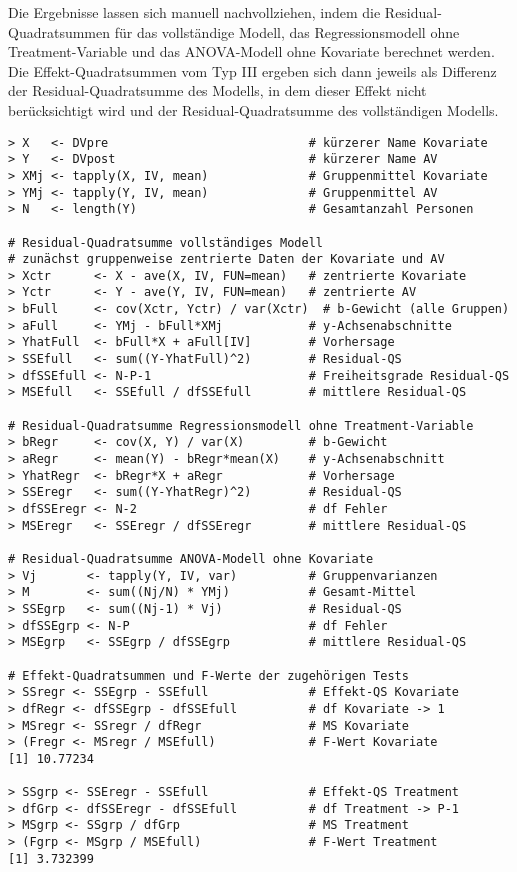 Die Ergebnisse lassen sich manuell nachvollziehen, indem die Residual-Quadratsummen für das vollständige Modell, das Regressionsmodell ohne Treatment-Variable und das ANOVA-Modell ohne Kovariate berechnet werden. Die Effekt-Quadratsummen vom Typ III ergeben sich dann jeweils als Differenz der Residual-Quadratsumme des Modells, in dem dieser Effekt nicht berücksichtigt wird und der Residual-Quadratsumme des vollständigen Modells.
\begin{lstlisting}
> X   <- DVpre                            # kürzerer Name Kovariate
> Y   <- DVpost                           # kürzerer Name AV
> XMj <- tapply(X, IV, mean)              # Gruppenmittel Kovariate
> YMj <- tapply(Y, IV, mean)              # Gruppenmittel AV
> N   <- length(Y)                        # Gesamtanzahl Personen

# Residual-Quadratsumme vollständiges Modell
# zunächst gruppenweise zentrierte Daten der Kovariate und AV
> Xctr      <- X - ave(X, IV, FUN=mean)   # zentrierte Kovariate
> Yctr      <- Y - ave(Y, IV, FUN=mean)   # zentrierte AV
> bFull     <- cov(Xctr, Yctr) / var(Xctr)  # b-Gewicht (alle Gruppen)
> aFull     <- YMj - bFull*XMj            # y-Achsenabschnitte
> YhatFull  <- bFull*X + aFull[IV]        # Vorhersage
> SSEfull   <- sum((Y-YhatFull)^2)        # Residual-QS
> dfSSEfull <- N-P-1                      # Freiheitsgrade Residual-QS
> MSEfull   <- SSEfull / dfSSEfull        # mittlere Residual-QS

# Residual-Quadratsumme Regressionsmodell ohne Treatment-Variable
> bRegr     <- cov(X, Y) / var(X)         # b-Gewicht
> aRegr     <- mean(Y) - bRegr*mean(X)    # y-Achsenabschnitt
> YhatRegr  <- bRegr*X + aRegr            # Vorhersage
> SSEregr   <- sum((Y-YhatRegr)^2)        # Residual-QS
> dfSSEregr <- N-2                        # df Fehler
> MSEregr   <- SSEregr / dfSSEregr        # mittlere Residual-QS

# Residual-Quadratsumme ANOVA-Modell ohne Kovariate
> Vj       <- tapply(Y, IV, var)          # Gruppenvarianzen
> M        <- sum((Nj/N) * YMj)           # Gesamt-Mittel
> SSEgrp   <- sum((Nj-1) * Vj)            # Residual-QS
> dfSSEgrp <- N-P                         # df Fehler
> MSEgrp   <- SSEgrp / dfSSEgrp           # mittlere Residual-QS

# Effekt-Quadratsummen und F-Werte der zugehörigen Tests
> SSregr <- SSEgrp - SSEfull              # Effekt-QS Kovariate
> dfRegr <- dfSSEgrp - dfSSEfull          # df Kovariate -> 1
> MSregr <- SSregr / dfRegr               # MS Kovariate
> (Fregr <- MSregr / MSEfull)             # F-Wert Kovariate
[1] 10.77234

> SSgrp <- SSEregr - SSEfull              # Effekt-QS Treatment
> dfGrp <- dfSSEregr - dfSSEfull          # df Treatment -> P-1
> MSgrp <- SSgrp / dfGrp                  # MS Treatment
> (Fgrp <- MSgrp / MSEfull)               # F-Wert Treatment
[1] 3.732399
\end{lstlisting}

